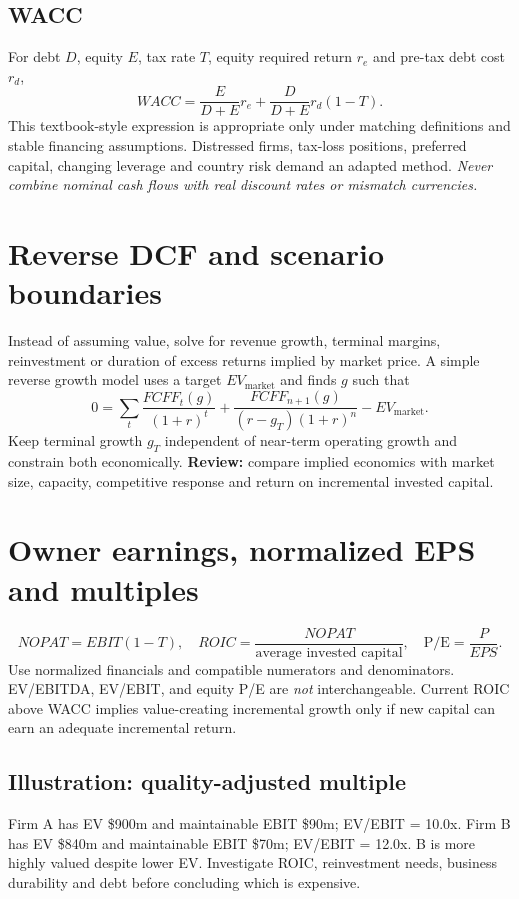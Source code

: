 \documentclass[11pt,letterpaper]{article}
\begin{document}
\subsection{WACC}
For debt $D$, equity $E$, tax rate $T$, equity required return $r_e$ and pre-tax debt cost $r_d$,
\[
WACC=\frac{E}{D+E}r_e+\frac{D}{D+E}r_d(1-T).
\]
This textbook-style expression is appropriate only under matching definitions and stable financing assumptions. Distressed firms, tax-loss positions, preferred capital, changing leverage and country risk demand an adapted method. \emph{Never combine nominal cash flows with real discount rates or mismatch currencies.}

\section{Reverse DCF and scenario boundaries}
Instead of assuming value, solve for revenue growth, terminal margins, reinvestment or duration of excess returns implied by market price. A simple reverse growth model uses a target $EV_{\text{market}}$ and finds $g$ such that
\[
0=\sum_t \frac{FCFF_t(g)}{(1+r)^t}+\frac{FCFF_{n+1}(g)}{(r-g_T)(1+r)^n}-EV_{\text{market}}.
\]
Keep terminal growth $g_T$ independent of near-term operating growth and constrain both economically. \textbf{Review:} compare implied economics with market size, capacity, competitive response and return on incremental invested capital.

\section{Owner earnings, normalized EPS and multiples}
\[
NOPAT=EBIT(1-T),\quad ROIC=\frac{NOPAT}{\text{average invested capital}},\quad
\text{P/E}=\frac{P}{EPS}.
\]
Use normalized financials and compatible numerators and denominators. EV/EBITDA, EV/EBIT, and equity P/E are \emph{not} interchangeable. Current ROIC above WACC implies value-creating incremental growth only if new capital can earn an adequate incremental return.

\subsection{Illustration: quality-adjusted multiple}
Firm A has EV \$900m and maintainable EBIT \$90m; EV/EBIT = 10.0x. Firm B has EV \$840m and maintainable EBIT \$70m; EV/EBIT = 12.0x. B is more highly valued despite lower EV. Investigate ROIC, reinvestment needs, business durability and debt before concluding which is expensive.
\end{document}

